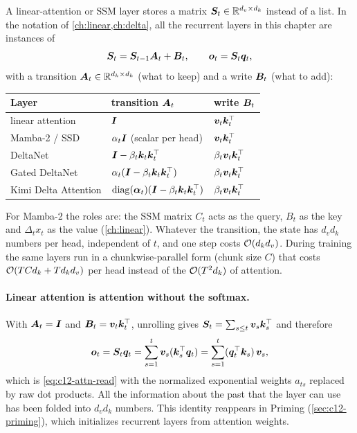 A linear-attention or SSM layer stores a matrix $\bm{S}_t \in \mathbb{R}^{d_v \times d_k}$ instead of a
list. In the notation of \cref{ch:linear,ch:delta}, all the recurrent layers in this chapter
are instances of
\begin{equation}\label{eq:c12-generic-rec}
  \bm{S}_t = \bm{S}_{t-1}\bm{A}_t + \bm{B}_t, \qquad \bm{o}_t = \bm{S}_t\bm{q}_t,
\end{equation}
with a transition $\bm{A}_t \in \mathbb{R}^{d_k\times d_k}$ (what to keep) and a write $\bm{B}_t$ (what to
add):
\begin{center}
\small
\begin{tabular}{@{}lll@{}}
\toprule
Layer & transition $\bm{A}_t$ & write $\bm{B}_t$ \\
\midrule
linear attention & $\bm{I}$ & $\bm{v}_t\bm{k}_t^{\top}$ \\
Mamba-2 / SSD \citep{dao2024ssd} & $\alpha_t\bm{I}$ (scalar per head) & $\bm{v}_t\bm{k}_t^{\top}$ \\
DeltaNet \citep{c02-schlag2021linear,c02-yang2024deltanet} & $\bm{I}-\beta_t\bm{k}_t\bm{k}_t^{\top}$ & $\beta_t\bm{v}_t\bm{k}_t^{\top}$ \\
Gated DeltaNet \citep{yang2025gdn} & $\alpha_t(\bm{I}-\beta_t\bm{k}_t\bm{k}_t^{\top})$ & $\beta_t\bm{v}_t\bm{k}_t^{\top}$ \\
Kimi Delta Attention \citep{kimi2025linear} & $\operatorname{diag}(\bm{\alpha}_t)(\bm{I}-\beta_t\bm{k}_t\bm{k}_t^{\top})$ & $\beta_t\bm{v}_t\bm{k}_t^{\top}$ \\
\bottomrule
\end{tabular}
\end{center}
For Mamba-2 the roles are: the SSM matrix $C_t$ acts as the query, $B_t$ as the key and
$\Delta_t x_t$ as the value (\cref{ch:linear}). Whatever the transition, the state has
$d_v d_k$ numbers per head, independent of $t$, and one step costs $\mathcal{O}(d_k d_v)$. During
training the same layers run in a chunkwise-parallel form (chunk size $C$) that costs
$\mathcal{O}(TCd_k + Td_kd_v)$ per head instead of the $\mathcal{O}(T^2 d_k)$ of attention.

\paragraph{Linear attention is attention without the softmax.} With $\bm{A}_t = \bm{I}$ and $\bm{B}_t =
\bm{v}_t\bm{k}_t^{\top}$, unrolling gives $\bm{S}_t = \sum_{s\le t}\bm{v}_s\bm{k}_s^{\top}$ and therefore
\begin{equation}\label{eq:c12-la-unroll}
  \bm{o}_t = \bm{S}_t\bm{q}_t = \sum_{s=1}^{t}\bm{v}_s(\bm{k}_s^{\top}\bm{q}_t) = \sum_{s=1}^{t}(\bm{q}_t^{\top}\bm{k}_s)\,\bm{v}_s ,
\end{equation}
which is \eqref{eq:c12-attn-read} with the normalized exponential weights $a_{ts}$ replaced by
raw dot products. All the information about the past that the layer can use has been folded
into $d_v d_k$ numbers. This identity reappears in Priming (\cref{sec:c12-priming}), which
initializes recurrent layers from attention weights.


